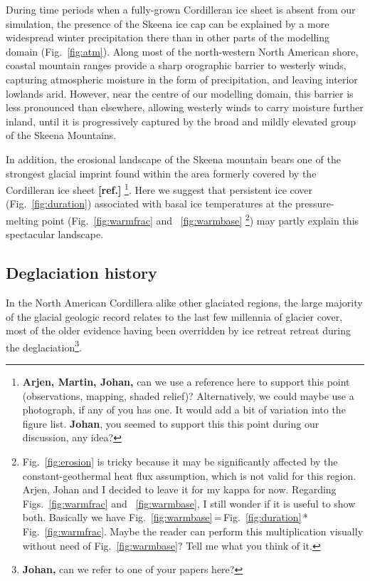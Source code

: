 \documentclass[tc, manuscript]{copernicus}
\newcommand{\aref}[0]{\textbf{[ref.]}}
\begin{document}
During time periods when a fully-grown Cordilleran ice sheet is absent from our
simulation, the presence of the Skeena ice cap can be explained by a more
widespread winter precipitation there than in other parts of the modelling
domain (Fig.~\ref{fig:atm}). Along most of the north-western North American
shore, coastal mountain ranges provide a sharp orographic barrier to westerly
winds, capturing atmospheric moisture in the form of precipitation, and leaving
interior lowlands arid. However, near the centre of our modelling domain, this
barrier is less pronounced than
elsewhere, allowing westerly winds to carry moisture further inland, until it
is progressively captured by the broad and mildly elevated group of the Skeena
Mountains.

In addition, the erosional landscape of the Skeena mountain bears one of the
strongest glacial imprint found within the area formerly covered by the
Cordilleran ice sheet \aref%
\footnote{\textbf{Arjen, Martin, Johan,} can we use a reference here to support
    this point (observations, mapping, shaded relief)? Alternatively, we could
    maybe use a photograph, if any of you has one. It would add a bit of
    variation into the figure list. \textbf{Johan}, you seemed to support this
    this point during our discussion, any idea?}.
Here we suggest that persistent ice cover (Fig.~\ref{fig:duration})
associated with basal ice temperatures at the pressure-melting point
(Fig.~\ref{fig:warmfrac} and ~\ref{fig:warmbase}%
\footnote{Fig.~\ref{fig:erosion} is tricky because it may be significantly
    affected by the constant-geothermal heat flux assumption, which is not
    valid for this region. Arjen, Johan and I decided to leave it for my kappa
    for now. Regarding Figs.~\ref{fig:warmfrac} and ~\ref{fig:warmbase}, I
    still wonder if it is useful to show both. Basically we have
    Fig.~\ref{fig:warmbase}\,=\,Fig.~\ref{fig:duration}\,*\,Fig.~\ref{fig:warmfrac}.
    Maybe the reader can perform this multiplication visually without need of
    Fig.~\ref{fig:warmbase}? Tell me what you think of it.})
may partly explain this spectacular landscape.

\subsection{Deglaciation history}

In the North American Cordillera alike other glaciated regions, the large
majority of the glacial geologic record relates to the last few millennia of
glacier cover, most of the older evidence having been overridden by ice retreat
retreat during the deglaciation\footnote{\textbf{Johan,} can we refer to one
of your papers here?}.
\end{document}
